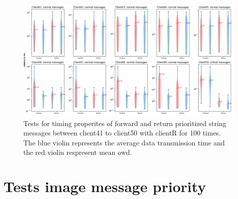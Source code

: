 \begin{figure}
    \includegraphics[width=\textheight]{figures/appendix/priority_tests/log_violin_50clients_string_figure_5.png}\hfill 
    \caption{Tests for timing properites of forward and return prioritized string messages between client41 to client50 
    with clientR for 100 times. The blue violin represents the average data transmission time and the red violin 
    respresent mean \gls{owd}.} \label{fig: priority-50clients-string-e}
\end{figure}


\newpage
\section{Tests image message priority}\label{chap: append-image-priority}



